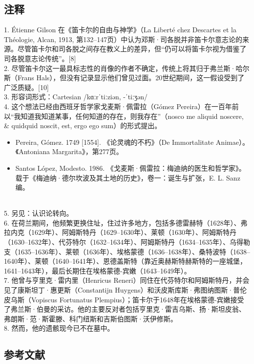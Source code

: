 \subsection{注释}
1. Étienne Gilson 在《笛卡尔的自由与神学》（La Liberté chez Descartes et la Théologie, Alcan, 1913, 第132–147页）中认为邓斯·司各脱并非笛卡尔意志论的来源。尽管笛卡尔和司各脱之间存在教义上的差异，但“仍可以将笛卡尔视为借鉴了司各脱意志论传统”。[8]\\
2. 尽管笛卡尔这一最具标志性的肖像的作者不确定，传统上将其归于弗兰斯·哈尔斯（Frans Hals），但没有记录显示他们曾见过面。20世纪期间，这一假设受到了广泛质疑。[10]\\
3. 形容词形式：Cartesian /kɑːrˈtiːziən, -ˈtiːʒən/\\
4. 这个想法已经由西班牙哲学家戈麦斯·佩雷拉（Gómez Pereira）在一百年前以“我知道我知道某事，任何知道的存在，则我存在”（nosco me aliquid noscere, & quidquid noscit, est, ergo ego sum）的形式提出。
\begin{itemize}
\item  Pereira, Gómez. 1749 [1554]. 《论灵魂的不朽》（De Immortalitate Animae）。《Antoniana Margarita》，第277页。
\item  Santos López, Modesto. 1986. 《戈麦斯·佩雷拉：梅迪纳的医生和哲学家》。载于《梅迪纳·德尔坎波及其土地的历史》，卷一：诞生与扩张，E. L. Sanz编。
\end{itemize}\\
5. 另见：认识论转向。\\
6. 在荷兰期间，他频繁更换住址，住过许多地方，包括多德雷赫特（1628年）、弗拉内克（1629年）、阿姆斯特丹（1629–1630年）、莱顿（1630年）、阿姆斯特丹（1630–1632年）、代芬特尔（1632–1634年）、阿姆斯特丹（1634–1635年）、乌得勒支（1635–1636年）、莱顿（1636年）、埃格蒙德（1636–1638年）、桑特波特（1638–1640年）、莱顿（1640–1641年）、恩德盖斯特（靠近奥赫斯特赫斯特的一座城堡，1641–1643年），最后长期住在埃格蒙德-宾嫩（1643–1649年）。\\
7. 他曾与亨里克·雷内里（Henricus Reneri）同住在代芬特尔和阿姆斯特丹，并会见了康斯坦丁·惠更斯（Constantijn Huygens）和沃皮斯库斯·弗图纳图斯·普伦皮乌斯（Vopiscus Fortunatus Plempius）；笛卡尔于1648年在埃格蒙德-宾嫩接受了弗兰斯·伯曼的采访。他的主要反对者包括亨里克·雷吉乌斯、扬·斯坦皮翁、弗朗斯·范·斯霍滕、科门纽斯和吉斯伯图斯·沃伊修斯。\\
8. 然而，他的遗骸现今已不在墓中。\\
\subsection{参考文献}  
